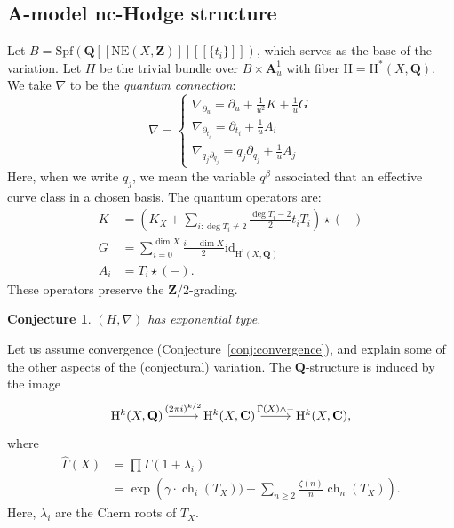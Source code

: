 \documentclass[11pt, reqno]{amsart}
\numberwithin{equation}{section}
\theoremstyle{plain}
\newtheorem{conjecture}[theorem]{Conjecture}
\theoremstyle{definition}
\theoremstyle{italicsname}
\newcommand{\id}{\mathrm{id}}
\DeclareMathOperator{\ch}{{ch}}
\newcommand{\rH}{\mathrm{H}}
\newcommand{\bA}{\mathbf{A}}
\newcommand{\bC}{\mathbf{C}}
\newcommand{\bZ}{\mathbf{Z}}
\newcommand{\bQ}{\mathbf{Q}}
\newcommand{\Spf}{\mathrm{Spf}}
\begin{document}
\subsection*{A-model nc-Hodge structure}

Let $B = \Spf(\bQ[[\mathrm{NE}(X, \bZ)]][[\{t_i\}]])$, which serves as the base of the variation.
Let $H$ be the trivial bundle over $B \times \bA^1_u$ with fiber $\rH= \rH^*(X, \bQ)$. We take $\nabla$ to be the \emph{quantum connection}:
\begin{equation*}
    \nabla = \begin{cases}
        \nabla_{\partial_u} = \partial_u + \frac{1}{u^2} K + \frac{1}{u} G \\
        \nabla_{\partial_{t_i}} = \partial_{t_i} + \frac{1}{u} A_i \\
        \nabla_{q_j \partial_{q_j}} = q_j \partial_{q_j} + \frac{1}{u} A_j
    \end{cases}
\end{equation*}
Here, when we write $q_j$, we mean the variable $q^\beta$ associated that an effective curve class in a chosen basis. 
The quantum operators are:
\begin{align*}
    K &= \left(K_X + \sum_{i:\deg T_i \neq 2} \frac{\deg T_i - 2}{2} t_i T_i \right) \star (-) \\
    G &= \sum_{i = 0}^{\dim X} \frac{i - \dim X}{2} \id_{\rH^i(X, \bQ)} \\
    A_i &= T_i \star (-).
\end{align*}
These operators preserve the $\bZ/2$-grading.

\begin{conjecture}
    $(H, \nabla)$ has exponential type. 
\end{conjecture}

Let us assume convergence (Conjecture~\ref{conj:convergence}), and explain some of the other aspects of the (conjectural) variation. The $\bQ$-structure is induced by the image 
\[
    \begin{tikzcd}
        \rH^k(X, \bQ) \ar[r, "(2 \pi i)^{k/2}"] & \rH^k(X, \bC) \ar[r, "\hat \Gamma(X) \wedge -"] & \rH^k(X, \bC),
    \end{tikzcd}
\]
where 
\begin{align*}
    \hat\Gamma(X) &= \prod \Gamma(1 + \lambda_i) \\
        &= \exp\left(\gamma \cdot \ch_i(T_X)) + \sum_{n \geq 2} \frac{\zeta(n)}{n} \ch_n(T_X) \right).
\end{align*}
Here, $\lambda_i$ are the Chern roots of $T_X$.
\end{document}
